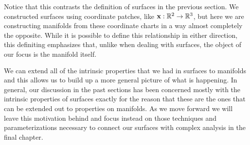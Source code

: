   Notice that this contrasts the definition of surfaces in the previous section. We constructed surfaces using coordinate patches, like $\mathbf{x}:\mathbb{R}^2\to\mathbb{R}^3$, but here we are constructing manifolds from these coordinate charts in a way almost completely the opposite. While it is possible to define this relationship in either direction, this definiting emphasizes that, unlike when dealing with surfaces, the object of our focus is the manifold itself.

  We can extend all of the intrinsic properties that we had in surfaces to manifolds and this allows us to build up a more general picture of what is happening. In general, our discussion in the past sections has been concerned mostly with the intrinsic properties of surfaces exactly for the reason that these are the ones that can be extended out to properties on manifolds. As we move forward we will leave this motivation behind and focus instead on those techniques and parameterizations necessary to connect our surfaces with complex analysis in the final chapter.


